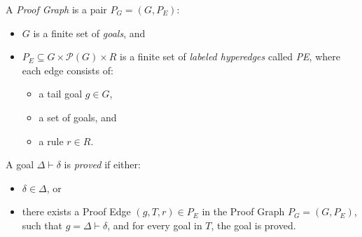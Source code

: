 \begin{definition}
\label{def:pg}
A \emph{Proof Graph} is a pair $P_G = (G, P_E)$:
\begin{itemize}[noitemsep]
  \item \( G \) is a finite set of \emph{goals}, and
  \item \( P_E \subseteq G \times \mathcal{P}(G) \times R \) is a finite set of \emph{labeled hyperedges} called \emph{\gls{PE}}, where each edge consists of:
  \begin{itemize}[noitemsep]
    \item a tail goal \( g \in G \),
    \item a set of goals, and
    \item a rule \( r \in R \).
  \end{itemize}
\end{itemize}
\end{definition}

\begin{definition}
A goal \( \Delta \vdash \delta \) is \emph{proved} if either:
\begin{itemize}[noitemsep]
  \item \( \delta \in \Delta \), or
  \item there exists a Proof Edge \( (g, T, r) \in P_E \) in the Proof Graph \( P_G = (G, P_E) \), such that \( g = \Delta \vdash \delta \), and for every goal in \(T\), the goal is proved.
\end{itemize}
\end{definition}

